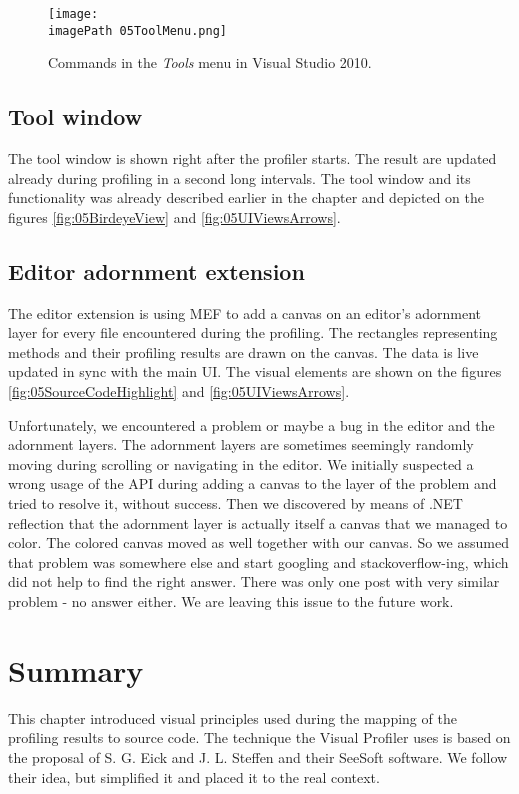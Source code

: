 \begin{figure}
	\centering
		\texttt{[image: \\imagePath 05ToolMenu.png]}
		\caption{Commands in the \textit{Tools} menu in Visual Studio 2010. }
	\label{fig:05ToolMenu}
\end{figure}

\subsection{Tool window}
The tool window is shown right after the profiler starts. The result are updated already during profiling in a second long intervals. The tool window and its functionality was already described earlier in the chapter and depicted on the figures \ref{fig:05BirdeyeView} and \ref{fig:05UIViewsArrows}.

\subsection{Editor adornment extension}
\label{sec:06EditorAdorExt}
The editor extension is using MEF to add a canvas on an editor's adornment layer for every file encountered during the profiling. The rectangles representing methods and their profiling results are drawn on the canvas. The data is live updated in sync with the main UI. The visual elements are shown on the figures \ref{fig:05SourceCodeHighlight} and \ref{fig:05UIViewsArrows}.

Unfortunately, we encountered a problem or maybe a bug in the editor and the adornment layers. The adornment layers are sometimes seemingly randomly moving during scrolling or navigating in the editor. We initially suspected a wrong usage of the API during adding a canvas to the layer of the problem and tried to resolve it, without success. Then we discovered by means of .NET reflection that the adornment layer is actually itself a canvas that we managed to color. The colored canvas moved as well together with our canvas. So we assumed that problem was somewhere else and start googling and stackoverflow-ing, which did not help to find the right answer. There was only one post with very similar problem - no answer either. We are leaving this issue to the future work.

\section{Summary}
This chapter introduced visual principles used during the mapping of the profiling results to source code. The technique the Visual Profiler uses is based on the proposal of S. G. Eick and J. L. Steffen and their SeeSoft software. We follow their idea, but simplified it and placed it to the real context.

